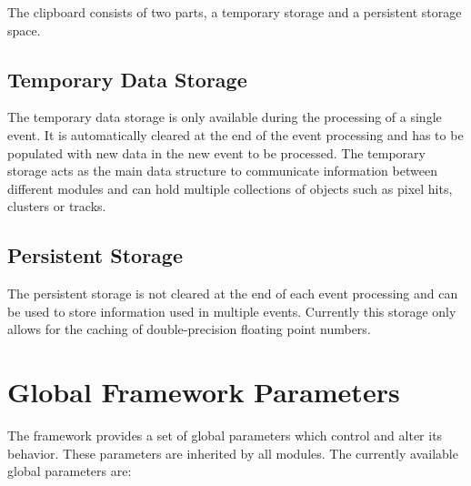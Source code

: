 The clipboard consists of two parts, a temporary storage and a persistent storage space.

\subsection{Temporary Data Storage}
The temporary data storage is only available during the processing of a single event.
It is automatically cleared at the end of the event processing and has to be populated with new data in the new event to be processed.
The temporary storage acts as the main data structure to communicate information between different modules and can hold multiple collections of \corry objects such as pixel hits, clusters or tracks.

\subsection{Persistent Storage}
The persistent storage is not cleared at the end of each event processing and can be used to store information used in multiple events.
Currently this storage only allows for the caching of double-precision floating point numbers.


\section{Global Framework Parameters}
\label{sec:framework_parameters}
The \corry framework provides a set of global parameters which control and alter its behavior. These parameters are inherited by all modules.
The currently available global parameters are:

